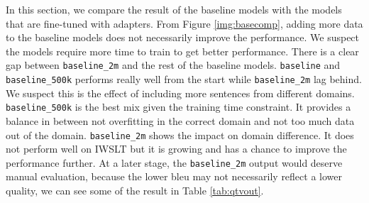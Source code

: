In this section, we compare the result of the baseline models with the models that are fine-tuned with adapters. From Figure \ref{img:basecomp}, adding more data to the baseline models does not necessarily improve the performance. We suspect the models require more time to train to get better performance. There is a clear gap between \texttt{baseline\_2m} and the rest of the baseline models. \texttt{baseline} and \texttt{baseline\_500k} performs really well from the start while \texttt{baseline\_2m} lag behind. We suspect this is the effect of including more sentences from different domains. \texttt{baseline\_500k} is the best mix given the training time constraint. It provides a balance in between not overfitting in the correct domain and not too much data out of the domain. \texttt{baseline\_2m} shows the impact on domain difference. It does not perform well on IWSLT but it is growing and has a chance to improve the performance further. At a later stage, the \texttt{baseline\_2m} output would deserve manual evaluation, because the lower bleu may not necessarily reflect a lower quality, we can see some of the result in Table \ref{tab:qtvout}.

